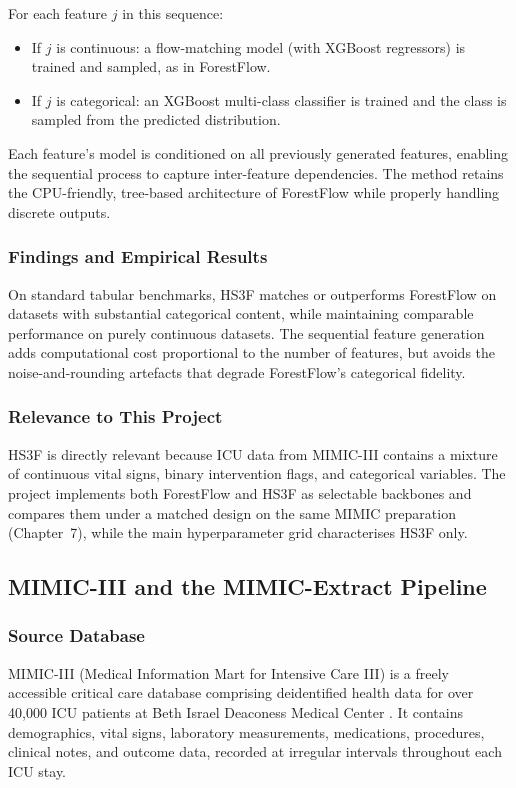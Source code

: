 For each feature $j$ in this sequence:
\begin{itemize}
    \item If $j$ is continuous: a flow-matching model (with XGBoost regressors) is trained and sampled, as in ForestFlow.
    \item If $j$ is categorical: an XGBoost multi-class classifier is trained and the class is sampled from the predicted distribution.
\end{itemize}

Each feature’s model is conditioned on all previously generated features, enabling the sequential process to capture inter-feature dependencies. The method retains the CPU-friendly, tree-based architecture of ForestFlow while properly handling discrete outputs.

\subsubsection{Findings and Empirical Results}
On standard tabular benchmarks, HS3F matches or outperforms ForestFlow on datasets with substantial categorical content, while maintaining comparable performance on purely continuous datasets. The sequential feature generation adds computational cost proportional to the number of features, but avoids the noise-and-rounding artefacts that degrade ForestFlow’s categorical fidelity.

\subsubsection{Relevance to This Project}
HS3F is directly relevant because ICU data from MIMIC-III contains a mixture of continuous vital signs, binary intervention flags, and categorical variables. The project implements both ForestFlow and HS3F as selectable backbones and compares them under a matched design on the same MIMIC preparation (Chapter~7), while the main hyperparameter grid characterises HS3F only.

\subsection{MIMIC-III and the MIMIC-Extract Pipeline}

\subsubsection{Source Database}
MIMIC-III (Medical Information Mart for Intensive Care III) is a freely accessible critical care database comprising deidentified health data for over 40,000 ICU patients at Beth Israel Deaconess Medical Center \cite{johnson2016mimic}. It contains demographics, vital signs, laboratory measurements, medications, procedures, clinical notes, and outcome data, recorded at irregular intervals throughout each ICU stay.

